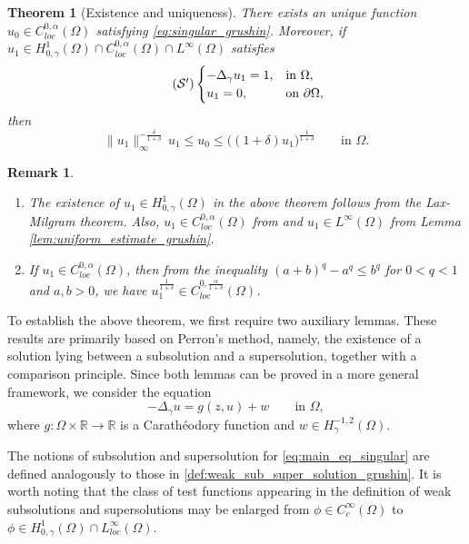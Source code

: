 \documentclass[11pt]{article}
\newtheorem{theorem}{Theorem}[section] %
\newtheorem*{remark}{Remark}
\newcommand{\om} {\Omega}
\newcommand{\Gr}{\Delta_{\gamma}}
\newcommand{\spacegr}{H^{1}_{0,\gamma}(\Omega)}
\begin{document}
\begin{theorem}[Existence and uniqueness]
\label{thm:singular-problem}
There exists an unique function $u_0 \in C_{loc}^{0,\alpha}(\om)$ satisfying \eqref{eq:singular_grushin}. Moreover, if $u_1 \in \spacegr \cap C_{loc}^{0,\alpha}(\om) \cap L^{\infty}(\om)$ satisfies
\begin{equation}\tag{$\mathcal{S}'$}
\label{eq:one_grushin}
\begin{cases}
-\Gr u_1 = 1, & \text{in } \Omega, \\
u_1 = 0, & \text{on } \partial \Omega,
\end{cases}
\end{equation}
then 
\begin{equation*}
\|u_1\|_\infty^{-\frac{\delta}{1+\delta}}\, u_1
\le
u_0
\le
\bigl( (1+\delta) u_1 \bigr)^{\frac{1}{1+\delta}}
\qquad \text{in } \Omega .
\end{equation*}
\end{theorem}
\begin{remark}
\begin{enumerate}
    \item The existence of $u_1 \in \spacegr$ in the above theorem follows from the Lax-Milgram theorem. Also, $u_1 \in C_{loc}^{0,\alpha}(\om)$ from \cite[Theorem $5.5$]{lanconelli_holder_Xelliptic} and $u_1 \in L^{\infty}(\om)$ from Lemma \ref{lem:uniform_estimate_grushin}.
    \item If $u_1 \in C_{loc}^{0,\alpha}(\om)$, then from the inequality $(a+b)^q - a^q \leq b^q$ for $0 < q < 1$ and $a,b >0$, we have $u_1^{\frac{1}{1+\delta}} \in C_{loc}^{0,\frac{\alpha}{1 + \delta}}(\om)$.
\end{enumerate}
\end{remark}
To establish the above theorem, we first require two auxiliary lemmas. These results are primarily based on Perron's method, namely, the existence of a solution lying between a subsolution and a supersolution, together with a comparison principle. Since both lemmas can be proved in a more general framework, we consider the equation
\begin{equation}
\label{eq:main_eq_singular}
- \Delta_{\gamma} u = g(z,u) + w \qquad \text{in } \Omega,
\end{equation}
where $g : \Omega \times \mathbb{R} \to \mathbb{R}$ is a Carath\'{e}odory function and $w \in H^{-1,2}_{\gamma}(\Omega)$.

The notions of subsolution and supersolution for \eqref{eq:main_eq_singular} are defined analogously to those in \eqref{def:weak_sub_super_solution_grushin}. It is worth noting that the class of test functions appearing in the definition of weak subsolutions and supersolutions may be enlarged from $\phi \in C_c^{\infty}(\Omega)$ to $\phi \in \spacegr \cap L^\infty_{loc}(\Omega)$.
\end{document}
